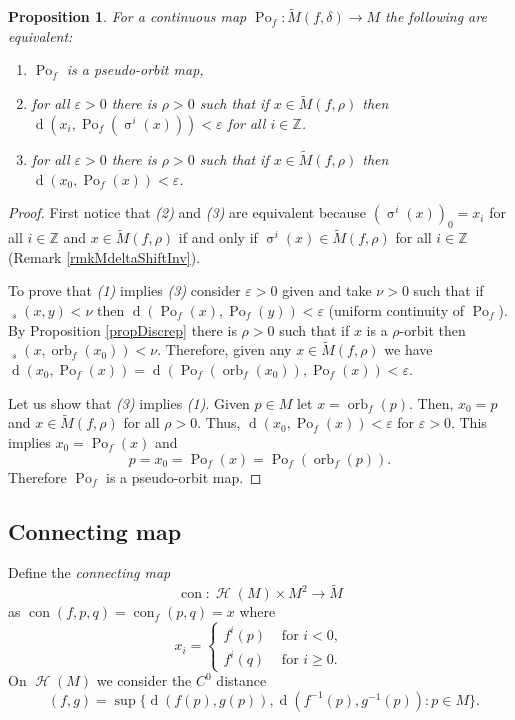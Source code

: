 \documentclass[12pt]{amsart}
\DeclareMathOperator{\ho}{\mathcal{H}}
\DeclareMathOperator{\homeo}{\ho}
\DeclareMathOperator{\shift}{\sigma}
\theoremstyle{plain}
\newtheorem{prop}[thm]{Proposition}
\theoremstyle{definition}
\theoremstyle{remark}
\DeclareMathOperator{\dist}{d}
\DeclareMathOperator{\distcc}{\dist_{C^0}}
\DeclareMathOperator{\tdist}{\tilde{d}}
\DeclareMathOperator{\orb}{orb}
\DeclareMathOperator{\con}{con}
\DeclareMathOperator{\pom}{Po}
\newcommand{\Z}{\mathbb Z}
\renewcommand{\epsilon}{\varepsilon}
\newcommand{\tM}{\tilde{M}}
\begin{document}
\begin{prop}
	\label{propDigre}
	For a continuous map $\pom_f\colon \tM(f,\delta)\to M$
	the following are equivalent:
	\begin{enumerate}
		\item $\pom_f$ is a pseudo-orbit map,
		\item for all $\epsilon>0$ there is $\rho>0$ such that if
		$x\in \tM(f,\rho)$ then
		$\dist(x_i,\pom_f(\shift^i(x)))<\epsilon$ for all $i\in\Z$.
		\item for all $\epsilon>0$ there is $\rho>0$ such that if
		$x\in \tM(f,\rho)$ then
		$\dist(x_0,\pom_f(x))<\epsilon$.
	\end{enumerate}
\end{prop}

\begin{proof}
	First notice that \textit{(2)} and \textit{(3)} are equivalent because $(\shift^i(x))_0=x_i$ for all $i\in\Z$ and
	$x\in \tM(f,\rho)$ if and only if $\shift^i(x)\in \tM(f,\rho)$ for all $i\in\Z$ (Remark \ref{rmkMdeltaShiftInv}).

	To prove that \textit{(1)} implies \textit{(3)} consider $\epsilon>0$ given and take $\nu>0$ such that
	if $\tdist_s(x,y)<\nu$ then $\dist(\pom_f(x),\pom_f(y))<\epsilon$ (uniform continuity of $\pom_f$).
	By Proposition \ref{propDiscrep} there is $\rho>0$ such that if $x$ is a $\rho$-orbit then
	$\tdist_s(x,\orb_f(x_0))<\nu.$
	Therefore, given any $x\in \tM(f,\rho)$ we have
	$\dist(x_0,\pom_f(x))
	=\dist(\pom_f(\orb_f(x_0)),\pom_f(x))
	<\epsilon$.

	Let us show that \textit{(3)} implies \textit{(1)}. Given $p\in M$ let $x=\orb_f(p)$.
	Then, $x_0=p$ and $x\in \tM(f,\rho)$ for all $\rho>0$.
	Thus,
	$\dist(x_0,\pom_f(x))<\epsilon$ for $\epsilon>0$.
	This implies $x_0=\pom_f(x)$ and
	$$p=x_0=\pom_f(x)=\pom_f(\orb_f(p)).$$
	Therefore $\pom_f$ is a pseudo-orbit map.
\end{proof}

\subsection{Connecting map}
\label{secConnecting map}
Define the \textit{connecting map}
$$\con\colon \homeo(M)\times M^2\to \tM$$ as
$\con(f,p,q)=\con_f(p,q)=x$ where
\[
x_i=\left\{
\begin{array}{ll}
	f^i(p) & \text{ for } i<0, \\
	f^i(q) & \text{ for } i\geq 0.
\end{array}
\right.
\]
On $\homeo(M)$ we consider the $C^0$ distance
$$\distcc(f,g)=\sup\{\dist(f(p),g(p)), \dist(f^{-1}(p),g^{-1}(p)):p\in M\}.$$
\end{document}
